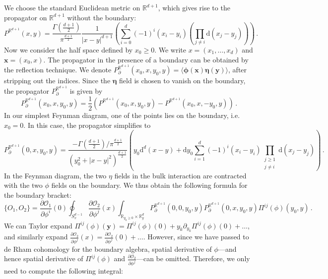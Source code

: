 \documentclass[11pt]{article}
\newcommand{\R}{\mathbb{R}}
\newcommand{\ddr}{\mathrm{d}}
\numberwithin{equation}{section}
\begin{document}
We choose the standard Euclidean metric on $\R^{d+1}$, which gives rise to the propagator on $\R^{d+1}$ without the boundary:
 \begin{equation}\label{eq:top_propa}
 		P^{\R^{d+1}}(x,y) = \frac{\Gamma(\frac{d+1}{2})}{\pi^{\frac{d+1}{2}}}\frac{1}{|x-y|^{d+1}} \left(\sum_{i = 0}^{d}(-1)^{i}(x_i-y_i)\left(\prod_{j\neq i}\ddr(x_j - y_j)\right)\right)\,.
 \end{equation}
Now we consider the half space defined by $x_0 \geq 0$. We write $x = (x_1,\dots,x_d)$ and $\boldsymbol{x} = (x_0,x)$. The propagator in the presence of a boundary can be obtained by the reflection technique. We denote $P^{\R^{d+1}}_{\partial}(x_0,x,y_0,y) = \langle \boldsymbol{\phi}(\boldsymbol{x})\boldsymbol{\eta}(\boldsymbol{y})\rangle$, after stripping out the indices. Since the $\boldsymbol{\eta}$ field is chosen to vanish on the boundary, the propagator $P^{\R^{d+1}}_{\partial}$ is given by
 \begin{equation}\label{eq:top_prop_withbdy}
 	P^{\R^{d+1}}_{\partial}(x_0,x,y_0,y) = \frac{1}{2}\left(P^{\R^{d+1}}(x_0,x,y_0,y) - P^{\R^{d+1}}(x_0,x,-y_0,y)\right)\,.
 \end{equation}
In our simplest Feynman diagram, one of the points lies on the boundary, i.e.\ $x_0=0$. In this case, the propagator simplifies to
 \begin{equation}
 	P^{\R^{d+1}}_{\partial}(0,x,y_0,y) = \frac{-\Gamma(\frac{d+1}{2})/\pi^{\frac{d+1}{2}}}{(y_0^2 + |x-y|^2)^{\frac{d+1}{2}}}(y_0\ddr^d(x-y) + \ddr y_0\sum_{i=1}^d(-1)^i (x_i-y_i)\prod_{\substack{j\geq1\\j\neq i}}\ddr(x_j-y_j))	\,.
 \end{equation}
In the Feynman diagram, the two $\eta$ fields in the bulk interaction are contracted with the two $\phi$ fields on the boundary. We thus obtain the following formula for the boundary bracket:
 \begin{equation}\label{eq:bdy_bracket_int}
 	\{O_1,O_2\} = \frac{\partial \mathcal{O}_1}{\partial \phi^i}(0)\oint_{S^{d-1}_x}\frac{\partial \mathcal{O}_2}{\partial \phi^j}(x)\int_{\R_{y_0\geq 0}\times \R^d_y}P^{\R^{d+1}}_{\partial}(0,0,y_0,y)P^{\R^{d+1}}_{\partial}(0,x,y_0,y)\Pi^{ij}(\phi)(y_0,y)\,.
 \end{equation}
We can Taylor expand $\Pi^{ij}(\phi)(\boldsymbol{y}) = \Pi^{ij}(\phi)(0) + y_k\partial_{y_k}\Pi^{ij}(\phi)(0) + \dots$, and similarly expand $\frac{\partial \mathcal{O}_2}{\partial \phi^j}(x) = \frac{\partial \mathcal{O}_2}{\partial \phi^j}(0) + \dots$. However, since we have passed to de Rham cohomology for the boundary algebra, spatial derivative of $\phi$—and hence spatial derivative of $\Pi^{ij}(\phi)$ and $\frac{\partial \mathcal{O}_2}{\partial \phi^j}$—can be omitted. Therefore, we only need to compute the following integral:
\end{document}
